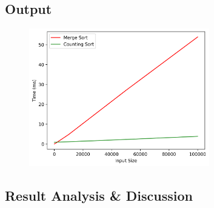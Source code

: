 \subsection{Output}
\begin{figure}[H]
    \centering
    \includegraphics[width=0.7\textwidth]{task1_merge_count.png}
\end{figure}
\subsection{Result Analysis \& Discussion}
